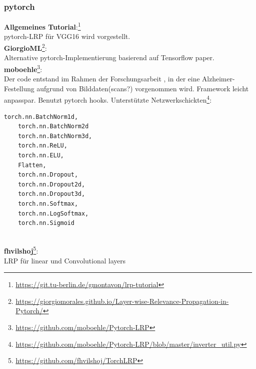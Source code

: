 \documentclass[twoside, 12pt,a4paper]{article}
\numberwithin{equation}{section}
\begin{document}
	\subsubsection{pytorch}
	
	\textbf{Allgemeines Tutorial}:\footnote{\url{https://git.tu-berlin.de/gmontavon/lrp-tutorial}}\\ pytorch-LRP für VGG16 wird vorgestellt.\\
	
	
	\noindent \textbf{GiorgioML}\footnote{\url{https://giorgiomorales.github.io/Layer-wise-Relevance-Propagation-in-Pytorch/}}:\\
	Alternative pytorch-Implementierung basierend auf Tensorflow paper.\\
	
	\noindent \textbf{moboehle}\footnote{\url{https://github.com/moboehle/Pytorch-LRP}}:\\
	Der code entstand im Rahmen der Forschungsarbeit \cite{lrp_alzheimer}, in der eine Alzheimer-Festellung aufgrund von Bilddaten(scans?) vorgenommen wird. Framework leicht anpasspar. Benutzt pytorch hooks. 
	\noindent Unterstützte Netzwerkschickten\footnote{\url{https://github.com/moboehle/Pytorch-LRP/blob/master/inverter_util.py}}:\\

	\begin{lstlisting}[language=Python, caption=Verfügbare Schichten und Aktivierungsfunktionen]
	torch.nn.BatchNorm1d, 
	torch.nn.BatchNorm2d
	torch.nn.BatchNorm3d,
	torch.nn.ReLU, 
	torch.nn.ELU, 
	Flatten,
	torch.nn.Dropout,
	torch.nn.Dropout2d,
	torch.nn.Dropout3d,
	torch.nn.Softmax,
	torch.nn.LogSoftmax,
	torch.nn.Sigmoid
	
	\end{lstlisting}
	\noindent \textbf{fhvilshoj}\footnote{\url{https://github.com/fhvilshoj/TorchLRP}}:\\
	
	
	
	\noindent LRP für linear und Convolutional layers
	
\end{document}
